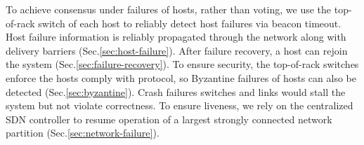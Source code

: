 To achieve consensus under failures of hosts, rather than voting, we use the top-of-rack switch of each host to reliably detect host failures via beacon timeout.
Host failure information is reliably propagated through the network along with delivery barriers (Sec.\ref{sec:host-failure}).
After failure recovery, a host can rejoin the system (Sec.\ref{sec:failure-recovery}).
To ensure security, the top-of-rack switches enforce the hosts comply with \sys protocol, so Byzantine failures of hosts can also be detected (Sec.\ref{sec:byzantine}).
Crash failures  switches and links would stall the system but not violate correctness.
To ensure liveness, we rely on the centralized SDN controller to resume operation of a largest strongly connected network partition (Sec.\ref{sec:network-failure}).
\fi







